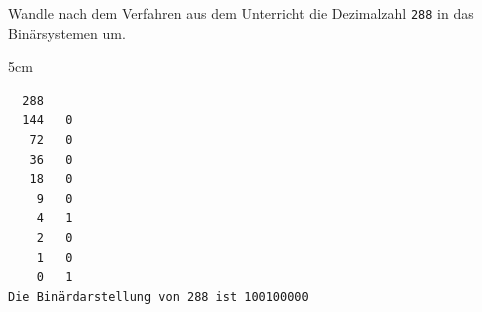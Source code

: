 \question[2]
Wandle nach dem Verfahren aus dem Unterricht die Dezimalzahl \texttt{288} in das Binärsystemen um.
\begin{solutionbox}{5cm}
\begin{lstlisting}
  288
  144   0
   72   0
   36   0
   18   0
    9   0
    4   1
    2   0
    1   0
    0   1
Die Binärdarstellung von 288 ist 100100000
\end{lstlisting}
\end{solutionbox}
